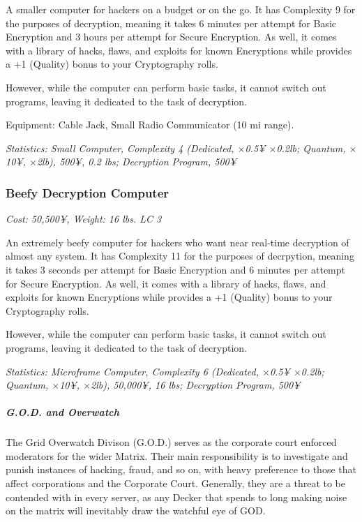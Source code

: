 \begin{multicols*}{3}
	A smaller computer for hackers on a budget or on the go. It has Complexity 9 for the purposes of decryption, meaning it takes 6 minutes per attempt for Basic Encryption and 3 hours per attempt for Secure Encryption. As well, it comes with a library of hacks, flaws, and exploits for known Encryptions while provides a +1 (Quality) bonus to your Cryptography rolls.
	
	However, while the computer can perform basic tasks, it cannot switch out programs, leaving it dedicated to the task of decryption.
	
	Equipment: Cable Jack, Small Radio Communicator (10 mi range).
	
	\textit{\textcolor{OliveGreen}{Statistics: Small Computer, Complexity 4 (Dedicated, \(\times\)0.5¥ \(\times\)0.2lb; Quantum, \(\times\)10¥, \(\times\)2lb), 500¥, 0.2 lbs; Decryption Program, 500¥}}
	
	
	\subsubsection*{Beefy Decryption Computer}
	
	\textit{\textcolor{NavyBlue}{Cost: 50,500¥, Weight: 16 lbs. LC 3}}
	
	An extremely beefy computer for hackers who want near real-time decryption of almost any system. It has Complexity 11 for the purposes of decrpytion, meaning it takes 3 seconds per attempt for Basic Encryption and 6 minutes per attempt for Secure Encryption. As well, it comes with a library of hacks, flaws, and exploits for known Encryptions while provides a +1 (Quality) bonus to your Cryptography rolls.
	
	However, while the computer can perform basic tasks, it cannot switch out programs, leaving it dedicated to the task of decryption.
	
	\textit{\textcolor{OliveGreen}{Statistics: Microframe Computer, Complexity 6 (Dedicated, \(\times\)0.5¥ \(\times\)0.2lb; Quantum, \(\times\)10¥, \(\times\)2lb), 50,000¥, 16 lbs; Decryption Program, 500¥}}
	
	\subparagraph{G.O.D. and Overwatch}
	
	The Grid Overwatch Divison (G.O.D.) serves as the corporate court enforced moderators for the wider Matrix. Their main responsibility is to investigate and punish instances of hacking, fraud, and so on, with heavy preference to those that affect corporations and the Corporate Court. Generally, they are a threat to be contended with in every server, as any Decker that spends to long making noise on the matrix will inevitably draw the watchful eye of GOD. 
	

\end{multicols*}
